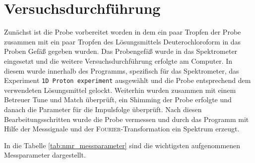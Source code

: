 \section{Versuchsdurchführung}
\label{sec:durchfuerung}
Zunächst ist die Probe vorbereitet worden in dem ein paar Tropfen der Probe zusammen mit ein paar Tropfen des Lösungsmittels Deuterochloroform in das Proben Gefäß gegeben wurden. Das Probengefäß wurde in das Spektrometer eingesetzt und die weitere Versuchsdurchführung erfolgte am Computer. In diesem wurde innerhalb des Programms, spezifisch für das Spektrometer, das Experiment \texttt{1D Proton experiment} ausgewählt und die Probe entsprechend dem verwendeten Lösungsmittel gelockt. Weiterhin wurden zusammen mit einem Betreuer Tune und Match überprüft, ein Shimming der Probe erfolgte und danach die Parameter für die Impulsfolge überprüft. Nach diesen Bearbeitungsschritten wurde die Probe vermessen und durch das Programm mit Hilfe der Messsignale und der \textsc{Fourier}-Transformation ein Spektrum erzeugt. 

In die Tabelle \ref{tab:nmr_messparameter} sind die wichtigsten aufgenommenen Messparameter dargestellt.
\vspace*{-5mm}
\begin{table}[h!]
	\renewcommand*{\arraystretch}{1.2}
	\centering
	\caption{wichtigste Messparameter des NMR-Versuches}
	\label{tab:nmr_messparameter}
\end{table}%
\FloatBarrier